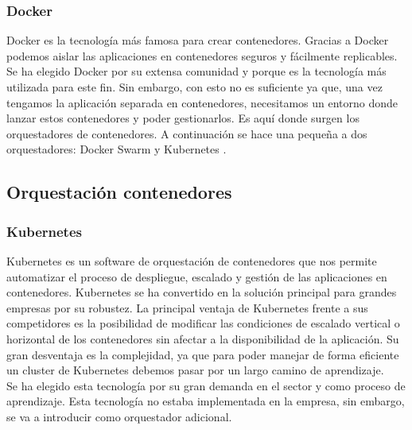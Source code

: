 		\subsubsection{Docker}
		\begin{paragraph}
			Docker es la tecnología más famosa para crear contenedores. Gracias a Docker podemos aislar las aplicaciones en contenedores seguros y fácilmente replicables. Se ha elegido Docker por su extensa comunidad y porque es la tecnología más utilizada para este fin. Sin embargo, con esto no es suficiente ya que, una vez tengamos la aplicación separada en contenedores, necesitamos un entorno donde lanzar estos contenedores y poder gestionarlos. Es aquí donde surgen los orquestadores de contenedores. A continuación se hace una pequeña a dos orquestadores: Docker Swarm \cite{swarm:online} y Kubernetes \cite{k8:online}.
		\end{paragraph}
	\subsection{Orquestación contenedores}
		\subsubsection{Kubernetes}
		\begin{paragraph}
			Kubernetes es un software de orquestación de contenedores que nos permite automatizar el proceso de despliegue, escalado y gestión de las aplicaciones en contenedores. Kubernetes se ha convertido en la solución principal para grandes empresas por su robustez. La principal ventaja de Kubernetes frente a sus competidores es la posibilidad de modificar las condiciones de escalado vertical o horizontal de los contenedores sin afectar a la disponibilidad de la aplicación. Su gran desventaja es la complejidad, ya que para poder manejar de forma eficiente un cluster de Kubernetes debemos pasar por un largo camino de aprendizaje. \\
			Se ha elegido esta tecnología por su gran demanda en el sector y como proceso de aprendizaje. Esta tecnología no estaba implementada en la empresa, sin embargo, se va a introducir como orquestador adicional.
		\end{paragraph}
